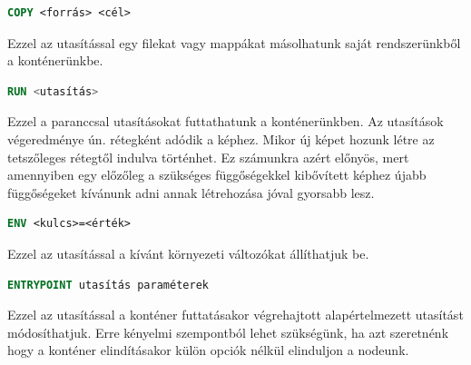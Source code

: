 \begin{lstlisting}[language=Dockerfile]
    COPY <forrás> <cél>
\end{lstlisting}
Ezzel az utasítással egy filekat vagy mappákat másolhatunk saját rendszerünkből a konténerünkbe.

\begin{lstlisting}[language=Dockerfile]
    RUN <utasítás>
\end{lstlisting}
Ezzel a paranccsal utasításokat futtathatunk a konténerünkben. Az utasítások végeredménye ún. rétegként adódik a képhez. Mikor új képet hozunk létre az tetszőleges rétegtől indulva történhet. Ez számunkra azért előnyös, mert amennyiben egy előzőleg a szükséges függőségekkel kibővített képhez újabb függőségeket kívánunk adni annak létrehozása jóval gyorsabb lesz.
\begin{lstlisting}[language=Dockerfile]
    ENV <kulcs>=<érték>
\end{lstlisting}
Ezzel az utasítással a kívánt környezeti változókat állíthatjuk be.
\begin{lstlisting}[language=Dockerfile]
    ENTRYPOINT utasítás paraméterek
\end{lstlisting}
Ezzel az utasítással a konténer futtatásakor végrehajtott alapértelmezett utasítást módosíthatjuk. Erre kényelmi szempontból lehet szükségünk, ha azt szeretnénk hogy a konténer elindításakor külön opciók nélkül elinduljon a nodeunk.

